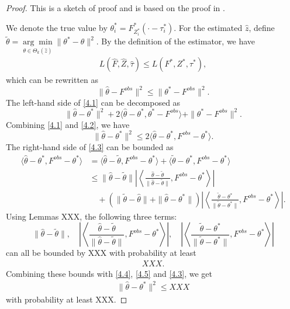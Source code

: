 \begin{proof}
This is a sketch of proof and is based on the proof in \cite{Gao2015a}.

We denote the true value by $\theta^*_i = F^*_{Z_i^*}(\cdot - \tau_i^*)$. 
For the estimated $\hat z$, define $ \tilde \theta = \underset{\theta\in\Theta_k(\hat z)}{\arg\min} \| \theta^* - \theta\|^2 $.
By the definition of the estimator, we  have
\begin{align*}
L(\hat F, \hat Z, \hat \tau) \leq L(F^*, Z^*, \tau^*),
\end{align*}
which can be rewritten as
\begin{equation}\label{4.1}
\| \hat \theta - F^{obs}\|^2 \leq \|\theta^* - F^{obs}\|^2.
\end{equation}
The left-hand side of \eqref{4.1} can be decomposed as
\begin{equation}\label{4.2}
\| \hat \theta - \theta^*\|^2 + 2\langle \hat \theta - \theta^*, \theta^* - F^{obs} \rangle + \| \theta^* - F^{obs}\|^2.
\end{equation}
Combining \eqref{4.1} and \eqref{4.2}, we have
\begin{equation}\label{4.3}
\| \hat \theta - \theta ^* \|^2 \leq 2 \langle \hat \theta - \theta^*, F^{obs}-\theta^* \rangle.
\end{equation}
The right-hand side of \eqref{4.3} can be bounded as 
\begin{align}
\nonumber
\langle \hat \theta - \theta^*, F^{obs} - \theta^*\rangle 
&= 
\langle \hat \theta - \tilde\theta, F^{obs} - \theta^*\rangle 
+ \langle \tilde \theta - \theta^*, F^{obs} - \theta^*\rangle \\
\label{4.4}
&\leq 
\| \hat \theta - \tilde \theta \|  
\left| \left\langle \frac{\hat \theta - \tilde \theta}{\| \hat \theta - \tilde \theta \|}, F^{obs} - \theta^* \right\rangle \right|\\
\label{4.5}
& \quad + 
\left( \| \tilde \theta - \hat \theta \| +  \| \hat \theta -  \theta^* \| \right) 
\left| \left\langle \frac{\tilde \theta -  \theta^*}{\| \tilde \theta - \theta^* \|}, F^{obs} - \theta^* \right\rangle \right|.
\end{align}
Using Lemmas XXX, the following three terms:
\begin{equation}\label{4.6}
\| \hat \theta - \tilde \theta \| , 
\quad 
\left| \left\langle \frac{\hat \theta - \tilde \theta}{\| \hat \theta - \tilde \theta \|}, F^{obs} - \theta^* \right\rangle \right|,
\quad
\left| \left\langle \frac{\tilde \theta -  \theta^*}{\| \tilde \theta - \theta^* \|}, F^{obs} - \theta^* \right\rangle \right|
\end{equation}
can all be bounded by XXX with probability at least
\begin{align*}
XXX.
\end{align*}
Combining these bounds with \eqref{4.4}, \eqref{4.5}
and \eqref{4.3}, we get
\begin{align*}
\|\hat \theta - \theta^* \|^2 \leq XXX
\end{align*}
with probability at least XXX. 


\end{proof}
